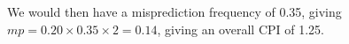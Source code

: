 \documentclass{article}
\begin{document}
We would then have a misprediction frequency of 0.35, giving $mp = 0.20 \times
0.35 \times 2 = 0.14$, giving an overall CPI of 1.25.
\end{document}

